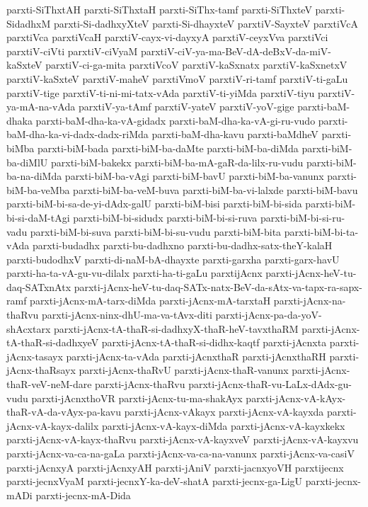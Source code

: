 {parxti-SiThxtAH
parxti-SiThxtaH
parxti-SiThx-tamf
parxti-SiThxteV
parxti-SidadhxM
parxti-Si-dadhxyXteV
parxti-Si-dhayxteV
parxtiV-SayxteV
parxtiVcA
parxtiVca
parxtiVcaH
parxtiV-cayx-vi-dayxyA
parxtiV-ceyxVva
parxtiVci
parxtiV-ciVti
parxtiV-ciVyaM
parxtiV-ciV-ya-ma-BeV-dA-deBxV-da-miV-kaSxteV
parxtiV-ci-ga-mita
parxtiVcoV
parxtiV-kaSxnatx
parxtiV-kaSxnetxV
parxtiV-kaSxteV
parxtiV-maheV
parxtiVmoV
parxtiV-ri-tamf
parxtiV-ti-gaLu
parxtiV-tige
parxtiV-ti-ni-mi-tatx-vAda
parxtiV-ti-yiMda
parxtiV-tiyu
parxtiV-ya-mA-na-vAda
parxtiV-ya-tAmf
parxtiV-yateV
parxtiV-yoV-gige
parxti-baM-dhaka
parxti-baM-dha-ka-vA-gidadx
parxti-baM-dha-ka-vA-gi-ru-vudo
parxti-baM-dha-ka-vi-dadx-dadx-riMda
parxti-baM-dha-kavu
parxti-baMdheV
parxti-biMba
parxti-biM-bada
parxti-biM-ba-daMte
parxti-biM-ba-diMda
parxti-biM-ba-diMlU
parxti-biM-bakekx
parxti-biM-ba-mA-gaR-da-lilx-ru-vudu
parxti-biM-ba-na-diMda
parxti-biM-ba-vAgi
parxti-biM-bavU
parxti-biM-ba-vanunx
parxti-biM-ba-veMba
parxti-biM-ba-veM-buva
parxti-biM-ba-vi-lalxde
parxti-biM-bavu
parxti-biM-bi-sa-de-yi-dAdx-galU
parxti-biM-bisi
parxti-biM-bi-sida
parxti-biM-bi-si-daM-tAgi
parxti-biM-bi-sidudx
parxti-biM-bi-si-ruva
parxti-biM-bi-si-ru-vadu
parxti-biM-bi-suva
parxti-biM-bi-su-vudu
parxti-biM-bita
parxti-biM-bi-ta-vAda
parxti-budadhx
parxti-bu-dadhxno
parxti-bu-dadhx-satx-theY-kalaH
parxti-budodhxV
parxti-di-naM-bA-dhayxte
parxti-garxha
parxti-garx-havU
parxti-ha-ta-vA-gu-vu-dilalx
parxti-ha-ti-gaLu
parxtijAcnx
parxti-jAcnx-heV-tu-daq-SATxnAtx
parxti-jAcnx-heV-tu-daq-SATx-natx-BeV-da-sAtx-va-tapx-ra-sapx-ramf
parxti-jAcnx-mA-tarx-diMda
parxti-jAcnx-mA-tarxtaH
parxti-jAcnx-na-thaRvu
parxti-jAcnx-ninx-dhU-ma-va-tAvx-diti
parxti-jAcnx-pa-da-yoV-shAcxtarx
parxti-jAcnx-tA-thaR-si-dadhxyX-thaR-heV-tavxthaRM
parxti-jAcnx-tA-thaR-si-dadhxyeV
parxti-jAcnx-tA-thaR-si-didhx-kaqtf
parxti-jAcnxta
parxti-jAcnx-tasayx
parxti-jAcnx-ta-vAda
parxti-jAcnxthaR
parxti-jAcnxthaRH
parxti-jAcnx-thaRsayx
parxti-jAcnx-thaRvU
parxti-jAcnx-thaR-vanunx
parxti-jAcnx-thaR-veV-neM-dare
parxti-jAcnx-thaRvu
parxti-jAcnx-thaR-vu-LaLx-dAdx-gu-vudu
parxti-jAcnxthoVR
parxti-jAcnx-tu-ma-shakAyx
parxti-jAcnx-vA-kAyx-thaR-vA-da-vAyx-pa-kavu
parxti-jAcnx-vAkayx
parxti-jAcnx-vA-kayxda
parxti-jAcnx-vA-kayx-dalilx
parxti-jAcnx-vA-kayx-diMda
parxti-jAcnx-vA-kayxkekx
parxti-jAcnx-vA-kayx-thaRvu
parxti-jAcnx-vA-kayxveV
parxti-jAcnx-vA-kayxvu
parxti-jAcnx-va-ca-na-gaLa
parxti-jAcnx-va-ca-na-vanunx
parxti-jAcnx-va-casiV
parxti-jAcnxyA
parxti-jAcnxyAH
parxti-jAniV
parxti-jacnxyoVH
parxtijecnx
parxti-jecnxVyaM
parxti-jecnxY-ka-deV-shatA
parxti-jecnx-ga-LigU
parxti-jecnx-mADi
parxti-jecnx-mA-Dida
}
